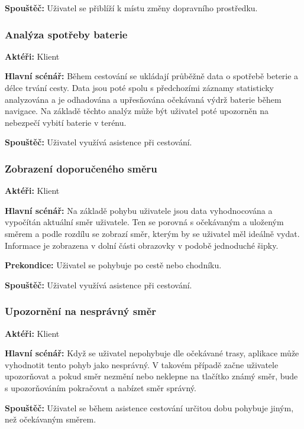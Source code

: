 \documentclass[czech,master,public,dept460,male,java,cpdeclaration]{diploma}
\newcommand{\usecase}[2]{\subsubsection{#1}\label{#2}}
\begin{document}
\vspace{0.1cm}
\noindent
\textbf{Spouštěč:} Uživatel se přiblíží k místu změny dopravního prostředku.



\usecase{Analýza spotřeby baterie}{analyzabaterie}
\textbf{Aktéři:} Klient

\vspace{0.1cm}
\noindent
\textbf{Hlavní scénář:} Během cestování se ukládají průběžně data o spotřebě beterie a délce trvání
cesty. Data jsou poté spolu s předchozími záznamy statisticky analyzována a je odhadována a upřesňována
očekávaná výdrž baterie během navigace. Na základě těchto analýz může být uživatel poté upozorněn na
nebezpečí vybití baterie v terénu.

\vspace{0.1cm}
\noindent
\textbf{Spouštěč:} Uživatel využívá asistence při cestování.



\usecase{Zobrazení doporučeného směru}{zobrazenismeru}
\textbf{Aktéři:} Klient

\vspace{0.1cm}
\noindent
\textbf{Hlavní scénář:} Na základě pohybu uživatele jsou data vyhodnocována a vypočítán aktuální směr uživatele.
Ten se porovná s očekávaným a uloženým směrem a podle rozdílu se zobrazí směr, kterým by se uživatel měl ideálně
vydat. Informace je zobrazena v dolní části obrazovky v podobě jednoduché šipky.

\vspace{0.1cm}
\noindent
\textbf{Prekondice:} Uživatel se pohybuje po cestě nebo chodníku.

\vspace{0.1cm}
\noindent
\textbf{Spouštěč:} Uživatel využívá asistence při cestování.


\usecase{Upozornění na nesprávný směr}{upozorneninespravnysmer}
\textbf{Aktéři:} Klient

\vspace{0.1cm}
\noindent
\textbf{Hlavní scénář:} Když se uživatel nepohybuje dle očekávané trasy, aplikace může vyhodnotit
tento pohyb jako nesprávný. V takovém případě začne uživatele upozorňovat a pokud směr nezmění nebo
neklepne na tlačítko známý směr, bude s upozorňováním pokračovat a nabízet směr správný.

\vspace{0.1cm}
\noindent
\textbf{Spouštěč:} Uživatel se během asistence cestování určitou dobu pohybuje jiným, než očekávaným směrem.
\end{document}
